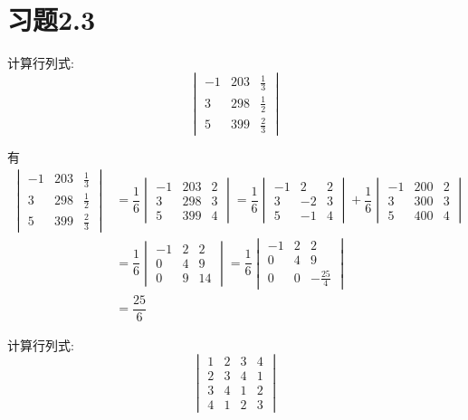 \documentclass{ctexart}
\begin{document}
\section*{习题2.3}
\begin{homework}[1(2)]
    计算行列式:
    \[\begin{vmatrix}
        -1&203&\frac13\\
        3&298&\frac12\\
        5&399&\frac23
    \end{vmatrix}\]
\end{homework}
\begin{solution}
    有
    \[\begin{aligned}
        \begin{vmatrix}
        -1&203&\frac13\\
        3&298&\frac12\\
        5&399&\frac23
    \end{vmatrix}
    &= \dfrac16\begin{vmatrix}
            -1&203&2\\
            3&298&3\\
            5&399&4
        \end{vmatrix}=\dfrac16\begin{vmatrix}
            -1&2&2\\3&-2&3\\5&-1&4
        \end{vmatrix}+\dfrac16\begin{vmatrix}
            -1&200&2\\3&300&3\\5&400&4
        \end{vmatrix}\\
    &= \dfrac16\begin{vmatrix}
        -1&2&2\\0&4&9\\0&9&14
        \end{vmatrix}=\dfrac16\begin{vmatrix}
            -1&2&2\\0&4&9\\0&0&-\frac{25}{4}
        \end{vmatrix}\\
    &= \dfrac{25}{6}
    \end{aligned}\]
\end{solution}
\begin{homework}[1(4)]
    计算行列式:
    \[\begin{vmatrix}
        1&2&3&4\\
        2&3&4&1\\
        3&4&1&2\\
        4&1&2&3
    \end{vmatrix}\]
\end{homework}
\end{document}
